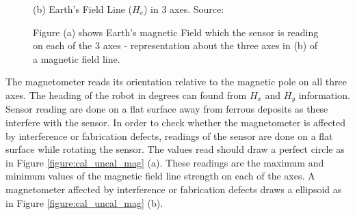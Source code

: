 \begin{figure}[H]
\begin{minipage}{0.48\linewidth}
		\caption*{(b) Earth's Field Line ($H_e$) in 3 axes. Source: \cite{magnetometer}}
	\end{minipage}
	\caption{Figure (a) shows Earth's magnetic Field which the sensor is reading on each of the 3 axes - representation about the three axes in (b) of a magnetic field line.}
	\label{figure:earthref}
\end{figure}

The magnetometer reads its orientation relative to the magnetic pole on all three axes. The heading of the robot in degrees can found from $H_x$ and $H_y$ information. Sensor reading are done on a flat surface away from ferrous deposits as these interfere with the sensor. In order to check whether the magnetometer is affected by interference or fabrication defects, readings of the sensor are done on a flat surface while rotating the sensor. The values read should draw a perfect circle as in Figure \ref{figure:cal_uncal_mag} (a). These readings are the maximum and minimum values of the magnetic field line strength on each of the axes. A magnetometer affected by interference or fabrication defects draws a ellipsoid as in Figure \ref{figure:cal_uncal_mag} (b).

